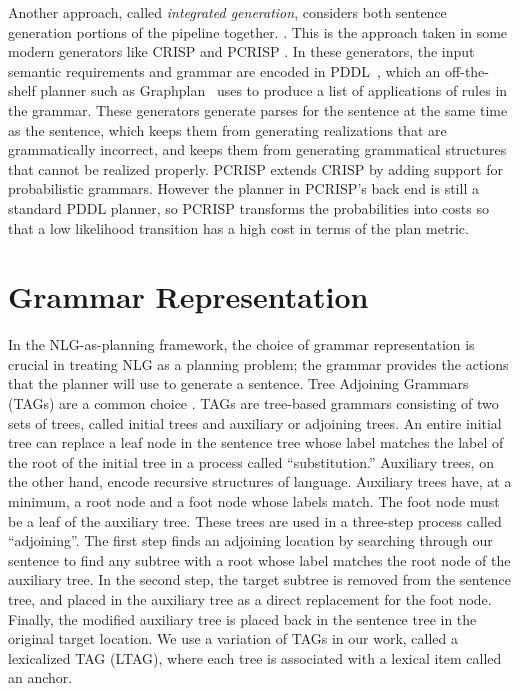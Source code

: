 Another approach, called {\em integrated generation}, considers both
sentence generation portions of the pipeline together.
\cite{koller_sentence_2007}.  This is the approach taken in some
modern generators like CRISP \cite{koller_sentence_2007} and PCRISP
\cite{bauer_sentence_2010}.  In these generators, the input semantic
requirements and grammar are encoded in PDDL~\cite{fox2003pddl2},
which an off-the-shelf planner such as
Graphplan~\cite{blum_1997_graphplan} uses to produce a list of
applications of rules in the grammar.  These generators generate
parses for the sentence at the same time as the sentence, which keeps
them from generating realizations that are grammatically incorrect,
and keeps them from generating grammatical structures that cannot be
realized properly. PCRISP extends CRISP by adding support for
probabilistic grammars. However the planner in PCRISP's back end is
still a standard PDDL planner, so PCRISP transforms the probabilities
into costs so that a low likelihood transition has a high cost in
terms of the plan metric.

\section{Grammar Representation}

In the NLG-as-planning framework, the choice of grammar representation
is crucial in treating NLG as a planning problem; the grammar provides
the actions that the planner will use to generate a sentence.  Tree
Adjoining Grammars (TAGs) are a common choice
\cite{koller_sentence_2007} \cite{bauer_sentence_2010}. TAGs are
tree-based grammars consisting of two sets of trees, called initial
trees and auxiliary or adjoining trees.  An entire initial tree can
replace a leaf node in the sentence tree whose label matches the label
of the root of the initial tree in a process called ``substitution.''
Auxiliary trees, on the other hand, encode recursive structures of
language.  Auxiliary trees have, at a minimum, a root node and a foot
node whose labels match.  The foot node must be a leaf of the
auxiliary tree.  These trees are used in a three-step process called
``adjoining''.  The first step finds an adjoining location by
searching through our sentence to find any subtree with a root whose
label matches the root node of the auxiliary tree.  In the second
step, the target subtree is removed from the sentence tree, and placed
in the auxiliary tree as a direct replacement for the foot node.
Finally, the modified auxiliary tree is placed back in the sentence
tree in the original target location. We use a variation of TAGs in
our work, called a lexicalized TAG (LTAG), where each tree is
associated with a lexical item called an anchor.

